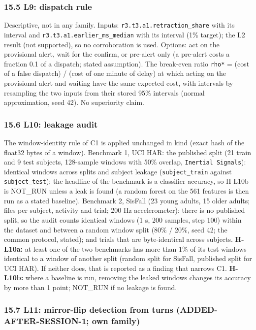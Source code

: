 \subsubsection*{15.5 L9: dispatch rule}

Descriptive, not in any family. Inputs: \texttt{r3.t3.a1.retraction\_share} with its interval and \texttt{r3.t3.a1.earlier\_ms\_median} with its interval (1\% target); the L2 result (not supported), so no corroboration is used. Options: act on the provisional alert, wait for the confirm, or pre-alert only (a pre-alert costs a fraction 0.1 of a dispatch; stated assumption). The break-even ratio \texttt{rho*} = (cost of a false dispatch) / (cost of one minute of delay) at which acting on the provisional alert and waiting have the same expected cost, with intervals by resampling the two inputs from their stored 95\% intervals (normal approximation, seed 42). No superiority claim.

\subsubsection*{15.6 L10: leakage audit}

The window-identity rule of C1 is applied unchanged in kind (exact hash of the float32 bytes of a window). Benchmark 1, UCI HAR: the published split (21 train and 9 test subjects, 128-sample windows with 50\% overlap, \texttt{Inertial Signals}): identical windows across splits and subject leakage (\texttt{subject\_train} against \texttt{subject\_test}); the headline of the benchmark is a classifier accuracy, so H-L10b is NOT\_RUN unless a leak is found (a random forest on the 561 features is then run as a stated baseline). Benchmark 2, SisFall (23 young adults, 15 older adults; files per subject, activity and trial; 200 Hz accelerometer): there is no published split, so the audit counts identical windows (1 s, 200 samples, step 100) within the dataset and between a random window split (80\% / 20\%, seed 42; the common protocol, stated); and trials that are byte-identical across subjects. \textbf{H-L10a:} at least one of the two benchmarks has more than 1\% of its test windows identical to a window of another split (random split for SisFall, published split for UCI HAR). If neither does, that is reported as a finding that narrows C1. \textbf{H-L10b:} where a baseline is run, removing the leaked windows changes its accuracy by more than 1 point; NOT\_RUN if no leakage is found.

\subsubsection*{15.7 L11: mirror-flip detection from turns (ADDED-AFTER-SESSION-1; own family)}

